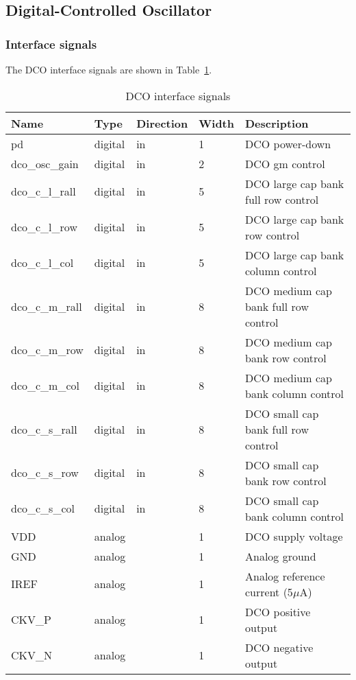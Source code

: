 \subsection{Digital-Controlled Oscillator}
\label{sec:dco}
\subsubsection{Interface signals}
The DCO interface signals are shown in Table~\ref{tab:dco_interface}. 

\begin{table}[!h]
  \centering
    \begin{tabular}{|p{3cm}|p{1.5cm}|p{2cm}|p{1.5cm}|p{7cm}|}
      \hline
      \rowcolor{tab-green}
    {\bf Name} & {\bf Type} & {\bf Direction} & {\bf Width} & {\bf Description} \\
    \hline \hline    
    pd & digital & in  & 1 & DCO power-down\\
    \hline
    dco\_osc\_gain & digital & in  & 2 & DCO gm control\\
    \hline
    dco\_c\_l\_rall & digital & in  & 5 & DCO large cap bank full row control\\
    \hline
    dco\_c\_l\_row & digital & in  & 5 & DCO large cap bank row control\\
    \hline
    dco\_c\_l\_col & digital & in  & 5 & DCO large cap bank column control\\
    \hline
    dco\_c\_m\_rall & digital & in  & 8 & DCO medium cap bank full row control\\
    \hline
    dco\_c\_m\_row & digital & in  & 8 & DCO medium cap bank row control\\
    \hline
    dco\_c\_m\_col & digital & in  & 8 & DCO medium cap bank column control\\
    \hline
    dco\_c\_s\_rall & digital & in  & 8 & DCO small cap bank full row control\\
    \hline
    dco\_c\_s\_row & digital & in  & 8 & DCO small cap bank row control\\
    \hline
    dco\_c\_s\_col & digital & in  & 8 & DCO small cap bank column control\\
    \hline
    VDD & analog &  & 1 & DCO supply voltage \\
    \hline
    GND & analog &    & 1 & Analog ground \\
    \hline
    IREF & analog &    & 1 & Analog reference current (5$\mu$A) \\
    \hline
    CKV\_P & analog &    & 1 & DCO positive output \\
    \hline
    CKV\_N & analog &    & 1 & DCO negative output \\
    \hline

  
    \end{tabular}
  \caption{DCO interface signals}
  \label{tab:dco_interface}
\end{table}

\newpage 

